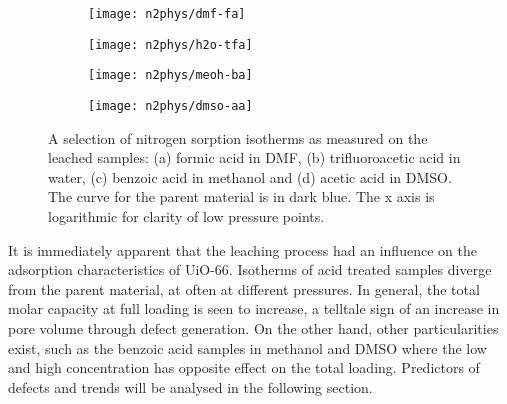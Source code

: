 \begin{figure}[htbp]
	\centering

	\begin{subfigure}{0.45\linewidth}
		\texttt{[image: n2phys/dmf-fa]}%
		\caption{}%
		\label{def:fgr:n2phys-dmf-fa}
	\end{subfigure}
	\begin{subfigure}{0.45\linewidth}
		\texttt{[image: n2phys/h2o-tfa]}%
		\caption{}%
		\label{def:fgr:n2phys-h2o-tfa}
	\end{subfigure}

	\begin{subfigure}{0.45\linewidth}
		\texttt{[image: n2phys/meoh-ba]}%
		\caption{}%
		\label{def:fgr:n2phys-meoh-ba}
	\end{subfigure}
	\begin{subfigure}{0.45\linewidth}
		\texttt{[image: n2phys/dmso-aa]}%
		\caption{}%
		\label{def:fgr:n2phys-dmso-aa}
	\end{subfigure}

	\caption{A selection of nitrogen sorption isotherms as measured on the
		leached samples: (a) formic acid in DMF, (b) trifluoroacetic
		acid in water, (c) benzoic acid in methanol and (d) acetic acid
        in DMSO. The curve for the parent material is in dark blue.
        The x axis is logarithmic for clarity of low pressure 
        points.}%
	\label{def:fgr:n2phys-dataset}
\end{figure}

It is immediately apparent that the leaching process had an influence 
on the adsorption characteristics of UiO-66. Isotherms of acid treated
samples diverge from the parent material, at often at different pressures.
In general, the total molar capacity at full loading is seen to increase,
a telltale sign of an increase in pore volume through defect generation.
On the other hand, other particularities exist, such as the benzoic acid
samples in methanol and DMSO where the low and high
concentration has opposite effect on the total loading. Predictors 
of defects and trends will be analysed in the following section.
